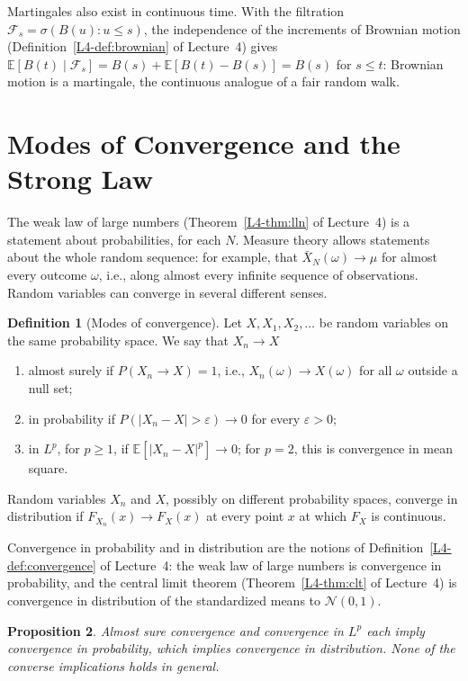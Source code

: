 \documentclass[11pt]{article}
\newcommand{\E}{\mathbb{E}}
\theoremstyle{definition}
\newtheorem{definition}{Definition}[section]
\theoremstyle{plain}
\newtheorem{proposition}[definition]{Proposition}
\theoremstyle{remark}
\begin{document}
Martingales also exist in continuous time. With the filtration $\mathcal{F}_s = \sigma(B(u) : u \leq s)$, the independence of the increments of Brownian motion (Definition~\ref{L4-def:brownian} of Lecture~4) gives $\E[B(t) \mid \mathcal{F}_s] = B(s) + \E[B(t) - B(s)] = B(s)$ for $s \leq t$: Brownian motion is a martingale, the continuous analogue of a fair random walk.

\section{Modes of Convergence and the Strong Law}\label{sec:convergence}

The weak law of large numbers (Theorem~\ref{L4-thm:lln} of Lecture~4) is a statement about probabilities, for each $N$. Measure theory allows statements about the whole random sequence: for example, that $\bar X_N(\omega) \to \mu$ for almost every outcome $\omega$, i.e., along almost every infinite sequence of observations. Random variables can converge in several different senses.

\begin{definition}[Modes of convergence]\label{def:convergence-modes}
    Let $X, X_1, X_2, \ldots$ be random variables on the same probability space. We say that $X_n \to X$
    \begin{enumerate}
        \item almost surely if $P(X_n \to X) = 1$, i.e., $X_n(\omega) \to X(\omega)$ for all $\omega$ outside a null set;
        \item in probability if $P(|X_n - X| > \varepsilon) \to 0$ for every $\varepsilon > 0$;
        \item in $L^p$, for $p \geq 1$, if $\E[|X_n - X|^p] \to 0$; for $p = 2$, this is convergence in mean square.
    \end{enumerate}
    Random variables $X_n$ and $X$, possibly on different probability spaces, converge in distribution if $F_{X_n}(x) \to F_X(x)$ at every point $x$ at which $F_X$ is continuous.
\end{definition}

Convergence in probability and in distribution are the notions of Definition~\ref{L4-def:convergence} of Lecture~4: the weak law of large numbers is convergence in probability, and the central limit theorem (Theorem~\ref{L4-thm:clt} of Lecture~4) is convergence in distribution of the standardized means to $\mathcal{N}(0, 1)$.

\begin{proposition}\label{prop:convergence-modes}
    Almost sure convergence and convergence in $L^p$ each imply convergence in probability, which implies convergence in distribution. None of the converse implications holds in general.
\end{proposition}
\end{document}

